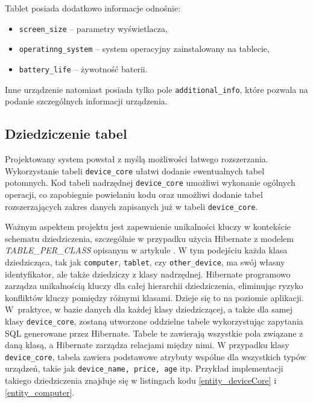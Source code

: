 Tablet posiada dodatkowo informacje odnośnie:
\begin{itemize}
	\item \texttt{screen\_size} -- parametry wyświetlacza,
	\item \texttt{operatinng\_system} -- system operacyjny zainstalowany na tablecie,
	\item \texttt{battery\_life} -- żywotność baterii.
\end{itemize}
Inne urządzenie natomiast posiada tylko pole \texttt{additional\_info}, które pozwala na podanie szczególnych informacji urządzenia.

\subsection{Dziedziczenie tabel}
\label{dzedziczenie_hibernate:label}
Projektowany system powstał z myślą możliwości łatwego rozszerzania. Wykorzystanie tabeli \texttt{device\_core} ułatwi dodanie ewentualnych tabel potomnych. Kod tabeli nadrzędnej \texttt{device\_core} umożliwi wykonanie ogólnych operacji, co zapobiegnie powielaniu kodu oraz umożliwi dodanie tabel rozszerzających zakres danych zapisanych już w tabeli \texttt{device\_core}. 

Ważnym aspektem projektu jest zapewnienie unikalności kluczy w kontekście schematu dziedziczenia, szczególnie w przypadku użycia Hibernate z modelem \emph{TABLE\_PER\_CLASS} opisanym w artykule \cite{hibernateinh}. W tym podejściu każda klasa dziedzicząca, tak jak \texttt{computer}, \texttt{tablet}, czy \texttt{other\_device}, ma swój własny identyfikator, ale także dziedziczy z klasy nadrzędnej. Hibernate programowo zarządza unikalnością kluczy dla całej hierarchii dziedziczenia, eliminując ryzyko konfliktów kluczy pomiędzy różnymi klasami. Dzieje się to na poziomie aplikacji. W~praktyce, w bazie danych dla każdej klasy dziedziczącej, a także dla samej klasy \texttt{device\_core}, zostaną utworzone oddzielne tabele wykorzystując zapytania SQL generowane przez Hibernate. Tabele te zawierają wszystkie pola związane z daną klasą, a Hibernate zarządza relacjami między nimi. W przypadku klasy \texttt{device\_core}, tabela zawiera podstawowe atrybuty wspólne dla wszystkich typów urządzeń, takie jak \texttt{device\_name, price, age} itp. Przykład implementacji takiego dziedziczenia znajduje się w listingach kodu \ref{entity_deviceCore} i \ref{entity_computer}.

